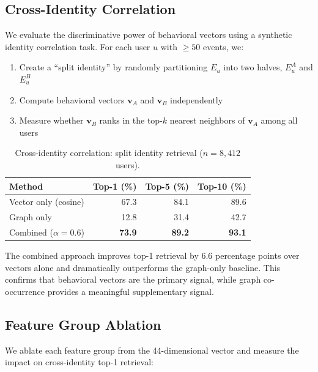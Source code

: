 \documentclass[11pt,a4paper]{article}
\begin{document}
\subsection{Cross-Identity Correlation}
\label{sec:exp_identity}

We evaluate the discriminative power of behavioral vectors using a synthetic identity correlation task. For each user $u$ with $\geq 50$ events, we:

\begin{enumerate}
    \item Create a ``split identity'' by randomly partitioning $E_u$ into two halves, $E_u^A$ and $E_u^B$
    \item Compute behavioral vectors $\mathbf{v}_A$ and $\mathbf{v}_B$ independently
    \item Measure whether $\mathbf{v}_B$ ranks in the top-$k$ nearest neighbors of $\mathbf{v}_A$ among all users
\end{enumerate}

\begin{table}[ht]
\centering
\caption{Cross-identity correlation: split identity retrieval ($n = 8{,}412$ users).}
\label{tab:identity_eval}
\begin{tabular}{lrrr}
\toprule
\textbf{Method} & \textbf{Top-1 (\%)} & \textbf{Top-5 (\%)} & \textbf{Top-10 (\%)} \\
\midrule
Vector only (cosine)     & 67.3 & 84.1 & 89.6 \\
Graph only               & 12.8 & 31.4 & 42.7 \\
Combined ($\alpha = 0.6$) & \textbf{73.9} & \textbf{89.2} & \textbf{93.1} \\
\bottomrule
\end{tabular}
\end{table}

The combined approach improves top-1 retrieval by 6.6 percentage points over vectors alone and dramatically outperforms the graph-only baseline. This confirms that behavioral vectors are the primary signal, while graph co-occurrence provides a meaningful supplementary signal.

\subsection{Feature Group Ablation}
\label{sec:exp_ablation}

We ablate each feature group from the 44-dimensional vector and measure the impact on cross-identity top-1 retrieval:
\end{document}
